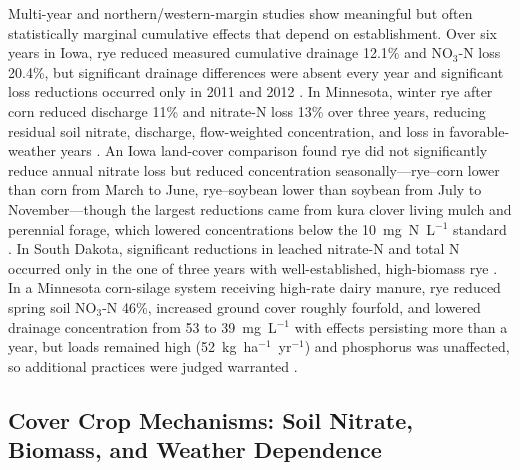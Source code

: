 \documentclass[11pt]{article}
\begin{document}
Multi-year and northern/western-margin studies show meaningful but often statistically marginal cumulative effects that depend on establishment. Over six years in Iowa, rye reduced measured cumulative drainage 12.1\% and NO$_3$-N loss 20.4\%, but significant drainage differences were absent every year and significant loss reductions occurred only in 2011 and 2012 \parencite{MartinezFeria2016}. In Minnesota, winter rye after corn reduced discharge 11\% and nitrate-N loss 13\% over three years, reducing residual soil nitrate, discharge, flow-weighted concentration, and loss in favorable-weather years \parencite{Strock2004}. An Iowa land-cover comparison found rye did not significantly reduce annual nitrate loss but reduced concentration seasonally---rye--corn lower than corn from March to June, rye--soybean lower than soybean from July to November---though the largest reductions came from kura clover living mulch and perennial forage, which lowered concentrations below the 10~mg~N~L$^{-1}$ standard \parencite{Qi2011b}. In South Dakota, significant reductions in leached nitrate-N and total N occurred only in the one of three years with well-established, high-biomass rye \parencite{Bawa2023}. In a Minnesota corn-silage system receiving high-rate dairy manure, rye reduced spring soil NO$_3$-N 46\%, increased ground cover roughly fourfold, and lowered drainage concentration from 53 to 39~mg~L$^{-1}$ with effects persisting more than a year, but loads remained high (52~kg~ha$^{-1}$~yr$^{-1}$) and phosphorus was unaffected, so additional practices were judged warranted \parencite{Krueger2013}.

\subsection{Cover Crop Mechanisms: Soil Nitrate, Biomass, and Weather Dependence}
\end{document}
